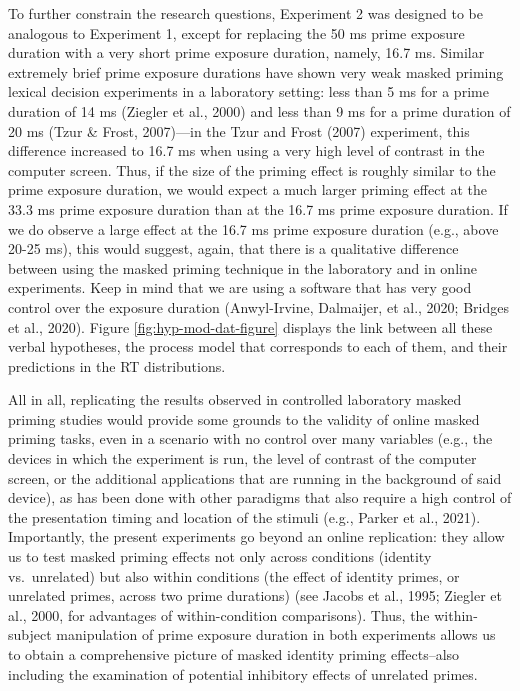 \documentclass[
  english,
  man,floatsintext]{apa6}
\begin{document}
To further constrain the research questions, Experiment 2 was designed to be analogous to Experiment 1, except for replacing the 50 ms prime exposure duration with a very short prime exposure duration, namely, 16.7 ms. Similar extremely brief prime exposure durations have shown very weak masked priming lexical decision experiments in a laboratory setting: less than 5 ms for a prime duration of 14 ms (Ziegler et al., 2000) and less than 9 ms for a prime duration of 20 ms (Tzur \& Frost, 2007)---in the Tzur and Frost (2007) experiment, this difference increased to 16.7 ms when using a very high level of contrast in the computer screen. Thus, if the size of the priming effect is roughly similar to the prime exposure duration, we would expect a much larger priming effect at the 33.3 ms prime exposure duration than at the 16.7 ms prime exposure duration. If we do observe a large effect at the 16.7 ms prime exposure duration (e.g., above 20-25 ms), this would suggest, again, that there is a qualitative difference between using the masked priming technique in the laboratory and in online experiments. Keep in mind that we are using a software that has very good control over the exposure duration (Anwyl-Irvine, Dalmaijer, et al., 2020; Bridges et al., 2020). Figure \ref{fig:hyp-mod-dat-figure} displays the link between all these verbal hypotheses, the process model that corresponds to each of them, and their predictions in the RT distributions.

All in all, replicating the results observed in controlled laboratory masked priming studies would provide some grounds to the validity of online masked priming tasks, even in a scenario with no control over many variables (e.g., the devices in which the experiment is run, the level of contrast of the computer screen, or the additional applications that are running in the background of said device), as has been done with other paradigms that also require a high control of the presentation timing and location of the stimuli (e.g., Parker et al., 2021). Importantly, the present experiments go beyond an online replication: they allow us to test masked priming effects not only across conditions (identity vs.~unrelated) but also within conditions (the effect of identity primes, or unrelated primes, across two prime durations) (see Jacobs et al., 1995; Ziegler et al., 2000, for advantages of within-condition comparisons). Thus, the within-subject manipulation of prime exposure duration in both experiments allows us to obtain a comprehensive picture of masked identity priming effects--also including the examination of potential inhibitory effects of unrelated primes.
\end{document}
